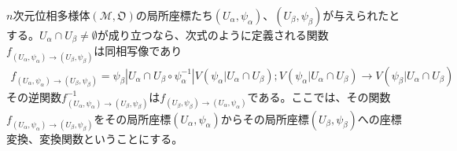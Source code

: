\documentclass[dvipdfmx]{jsarticle}
\begin{document}
\begin{thm}[座標変換]\label{8.3.1.6}
$n$次元位相多様体$\left( \mathcal{M},\mathfrak{O} \right)$の局所座標たち$\left( U_{\alpha},\psi_{\alpha} \right)$、$\left( U_{\beta},\psi_{\beta} \right)$が与えられたとする。$U_{\alpha} \cap U_{\beta} \neq \emptyset$が成り立つなら、次式のように定義される関数$f_{\left( U_{\alpha},\psi_{\alpha} \right) \rightarrow \left( U_{\beta},\psi_{\beta} \right)}$は同相写像であり
\begin{align*}
f_{\left( U_{\alpha},\psi_{\alpha} \right) \rightarrow \left( U_{\beta},\psi_{\beta} \right)} = \psi_{\beta}|U_{\alpha} \cap U_{\beta} \circ \psi_{\alpha}^{- 1}|V\left( \psi_{\alpha}|U_{\alpha} \cap U_{\beta} \right);V\left( \psi_{\alpha}|U_{\alpha} \cap U_{\beta} \right) \rightarrow V\left( \psi_{\beta}|U_{\alpha} \cap U_{\beta} \right)
\end{align*}
その逆関数$f_{\left( U_{\alpha},\psi_{\alpha} \right) \rightarrow \left( U_{\beta},\psi_{\beta} \right)}^{- 1}$は$f_{\left( U_{\beta},\psi_{\beta} \right) \rightarrow \left( U_{\alpha},\psi_{\alpha} \right)}$である。ここでは、その関数$f_{\left( U_{\alpha},\psi_{\alpha} \right) \rightarrow \left( U_{\beta},\psi_{\beta} \right)}$をその局所座標$\left( U_{\alpha},\psi_{\alpha} \right)$からその局所座標$\left( U_{\beta},\psi_{\beta} \right)$への座標変換、変換関数ということにする。
\end{thm}
\end{document}
